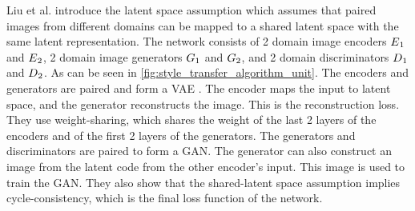 Liu et al. \cite{Liu2017} introduce the latent space assumption which assumes that paired images from different domains can be mapped to a shared latent space with the same latent representation.
The network consists of 2 domain image encoders $E\textsubscript{$1$}$ and $E\textsubscript{$2$}$, 2 domain image generators $G\textsubscript{$1$}$ and $G\textsubscript{$2$}$, and 2 domain discriminators $D\textsubscript{$1$}$ and $D\textsubscript{$2$}$.
As can be seen in \ref{fig:style_transfer_algorithm_unit}.
The encoders and generators are paired and form a \gls{VAE} \cite{kingma2022}.
The encoder maps the input to latent space, and the generator reconstructs the image.
This is the reconstruction loss.
They use weight-sharing, which shares the weight of the last 2 layers of the encoders and of the first 2 layers of the generators.
The generators and discriminators are paired to form a \gls{GAN}.
The generator can also construct an image from the latent code from the other encoder's input.
This image is used to train the \gls{GAN}.
They also show that the shared-latent space assumption implies cycle-consistency, which is the final loss function of the network.




